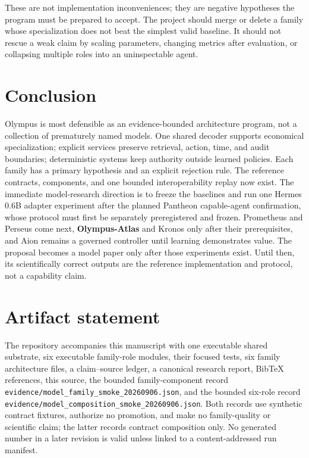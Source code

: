 \documentclass[10pt]{article}
\newcommand{\atlas}{\textbf{Olympus-Atlas}}
\begin{document}
These are not implementation inconveniences; they are negative hypotheses the
program must be prepared to accept. The project should merge or delete a family
whose specialization does not beat the simplest valid baseline. It should not
rescue a weak claim by scaling parameters, changing metrics after evaluation,
or collapsing multiple roles into an uninspectable agent.

\section{Conclusion}

Olympus is most defensible as an evidence-bounded architecture program, not a
collection of prematurely named models. One shared decoder supports economical
specialization; explicit services preserve retrieval, action, time, and audit
boundaries; deterministic systems keep authority outside learned policies. Each
family has a primary hypothesis and an explicit rejection rule. The reference
contracts, components, and one bounded interoperability replay now exist. The
immediate model-research direction is to freeze the baselines and run one Hermes
0.6B adapter experiment after the planned Pantheon capable-agent confirmation,
whose protocol must first be separately preregistered and frozen. Prometheus
and Perseus come next, \atlas{}
and Kronos only after
their prerequisites, and Aion remains a governed controller until learning
demonstrates value. The proposal becomes a model paper only after those
experiments exist. Until then, its scientifically correct outputs are the
reference implementation and protocol, not a capability claim.

\section*{Artifact statement}

The repository accompanies this manuscript with one executable shared
substrate, six executable family-role modules, their focused tests, six family
architecture files, a claim--source ledger, a canonical research report,
BibTeX references, this source, the bounded family-component record
\texttt{evidence/model\_family\_smoke\_20260906.json}, and the bounded six-role
record \texttt{evidence/model\_composition\_smoke\_20260906.json}. Both records
use synthetic contract fixtures, authorize no promotion, and make no
family-quality or scientific claim; the latter records contract composition
only. No generated number in a later revision is valid unless linked to a
content-addressed run manifest.



\end{document}
